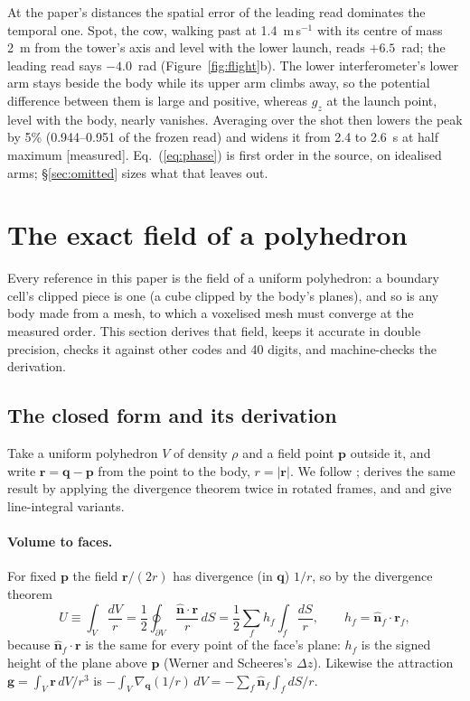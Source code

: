 \documentclass[10pt,a4paper]{article}
\newcommand{\vr}{\mathbf{r}}
\newcommand{\vn}{\hat{\mathbf{n}}}
\newcommand{\tagM}{\textsf{\small[measured]}}
\begin{document}
At the paper's distances the spatial error of the leading read dominates the temporal one. Spot, the
cow, walking past at 1.4~m\,s$^{-1}$ with its centre of mass 2~m from the tower's axis and level with
the lower launch, reads $+6.5$~rad; the leading read says $-4.0$~rad (Figure~\ref{fig:flight}b). The
lower interferometer's lower arm stays beside the body while its upper arm climbs away, so the
potential difference between them is large and positive, whereas $g_z$ at the launch point, level with
the body, nearly vanishes. Averaging over the shot then lowers the peak by 5\% (0.944--0.951 of the
frozen read) and widens it from 2.4 to 2.6~s at half maximum \tagM. Eq.~(\ref{eq:phase}) is first order in the source, on idealised arms; \S\ref{sec:omitted} sizes
what that leaves out.

\section{The exact field of a polyhedron}\label{sec:closed}

Every reference in this paper is the field of a uniform polyhedron: a boundary cell's clipped piece
is one (a cube clipped by the body's planes), and so is any body made from a mesh, to which a
voxelised mesh must converge at the measured order. This section derives that field, keeps it
accurate in double precision, checks it against other codes and 40 digits, and machine-checks the
derivation.

\subsection{The closed form and its derivation}\label{sec:cf}

Take a uniform polyhedron $V$ of density $\rho$ and a field point $\mathbf{p}$ outside it, and write
$\vr = \mathbf{q}-\mathbf{p}$ from the point to the body, $r=|\vr|$. We follow
\citet{werner1997}; \citet{okabe1979} derives the same result by applying the divergence theorem twice
in rotated frames, and \citet{holstein1996} and \citet{tsoulis2012} give line-integral variants.

\paragraph{Volume to faces.} For fixed $\mathbf{p}$ the field $\vr/(2r)$ has divergence (in
$\mathbf{q}$) $1/r$, so by the divergence theorem
\begin{equation}
U \equiv \int_V\frac{dV}{r} = \frac12\oint_{\partial V}\frac{\vn\cdot\vr}{r}\,dS
 = \frac12\sum_f h_f\int_f\frac{dS}{r},\qquad h_f = \vn_f\cdot\vr_f,
\label{eq:faces}
\end{equation}
because $\vn_f\cdot\vr$ is the same for every point of the face's plane: $h_f$ is the signed height
of the plane above $\mathbf{p}$ (Werner and Scheeres's $\Delta z$). Likewise the attraction
$\mathbf{g}=\int_V\vr\,dV/r^3$ is $-\int_V\nabla_{\mathbf{q}}(1/r)\,dV = -\sum_f\vn_f\int_f dS/r$.
\end{document}
